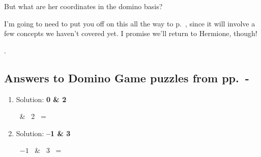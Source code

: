 But what are her coordinates in the domino basis?


I'm going to need to put you off on this all the way to
p.~\pageref{changeOfBasisOtherWayFinally}, since it will involve a few concepts
we haven't covered yet. I promise we'll return to Hermione, though!

\vspace{.6in}
.

\pagebreak
\subsection*{Answers to Domino Game puzzles from
pp.~\pageref{startDominoPuzzles}-\pageref{endDominoPuzzes}}
\label{dominoPuzzleAnswers}

\begin{enumerate}
\itemsep1em

\item {Solution: \textbf{0 \& 2}}

  \ \& \
2  \ = \
 \quad

\item {Solution: \textbf{--1 \& 3}}

\ $-1$  \ \& \
3  \ = \
 \quad


\end{enumerate}
